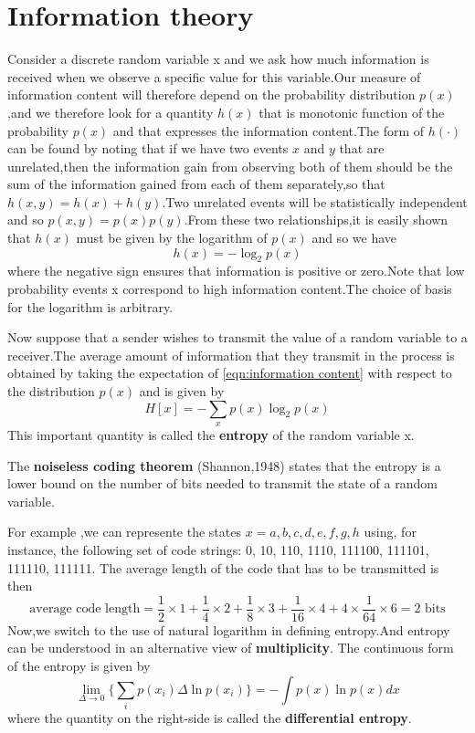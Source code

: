 \section{Information theory}
Consider a discrete random variable x and we ask how much information is received when we observe a specific value for this variable.Our measure of information content will therefore depend on the probability distribution $p(x)$,and we therefore look for a quantity $h(x)$ that is monotonic function of the probability $p(x)$ and that expresses the information content.The form of $h(\cdot)$ can be found by noting that if we have two events $x$ and $y$ that are unrelated,then the information gain from observing both of them should be the sum of the information gained from each of them separately,so that $h(x,y) = h(x)+ h(y)$.Two unrelated events will be statistically independent and so $p(x,y) = p(x)p(y)$.From these two relationships,it is easily shown that $h(x)$ must be given by the logarithm of $p(x)$ and so we have
\begin{equation}\label{eqn:information content}
h(x) = -\log_2p(x)
\end{equation}
where the negative sign ensures that information is positive or zero.Note that low probability events x correspond to high information content.The choice of basis for the logarithm is arbitrary.

Now suppose that a sender wishes to transmit the value of a random variable to a receiver.The average amount of information that they transmit in the process is obtained by taking the expectation of \ref{eqn:information content}  with respect to the distribution $p(x)$ and is given by
\begin{equation}
H[x] = -\sum\limits_{x}p(x)\log_2 p(x)
\end{equation}
This important quantity is called the \textbf{entropy} of the random variable x.

The \textbf{noiseless coding theorem} (Shannon,1948) states that the entropy is a lower bound on the number of bits needed to transmit the state of a random variable.

For example ,we can represente the states $x={a, b, c, d, e, f, g, h}$ using, for instance, the following set of code strings: 0, 10, 110, 1110, 111100, 111101, 111110, 111111.
The average length of the code that has to be transmitted is then
\begin{equation}
\text{average code length} = \dfrac{1}{2} \times 1 + \dfrac{1}{4} \times 2+\dfrac{1}{8} \times 3 + \dfrac{1}{16} \times 4 + 4\times \dfrac{1}{64}\times 6 = 2 \text{ bits}
\end{equation}
Now,we switch to the use of natural logarithm in defining entropy.And entropy can be understood in an alternative view of \textbf{multiplicity}.
The continuous form of the entropy is given by 
\begin{equation}
\lim\limits_{\Delta\rightarrow 0}\{\sum\limits_{i}p(x_i)\Delta \ln p(x_i) \} = -\int p(x)\ln p(x)dx
\end{equation}
where the quantity on the right-side is called the \textbf{differential entropy}.

